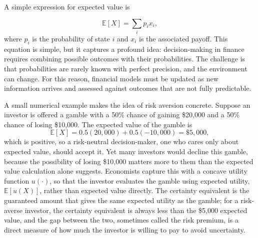 \documentclass[../ai_in_finance]{subfiles}
\begin{document}
A simple expression for expected value is

\begin{equation*}
\mathbb{E}[X] = \sum_i p_i x_i,
\end{equation*}
where $p_i$ is the probability of state $i$ and $x_i$ is the associated payoff. This equation is simple, but it captures a profound idea: decision-making in finance requires combining possible outcomes with their probabilities. The challenge is that probabilities are rarely known with perfect precision, and the environment can change. For this reason, financial models must be updated as new information arrives and assessed against outcomes that are not fully predictable.

A small numerical example makes the idea of risk aversion concrete. Suppose an investor is offered a gamble with a 50\% chance of gaining \$20,000 and a 50\% chance of losing \$10,000. The expected value of the gamble is
\begin{equation*}
\mathbb{E}[X] = 0.5(20{,}000) + 0.5(-10{,}000) = \$5{,}000,
\end{equation*}
which is positive, so a risk-neutral decision-maker, one who cares only about expected value, should accept it. Yet many investors would decline this gamble, because the possibility of losing \$10,000 matters more to them than the expected value calculation alone suggests. Economists capture this with a concave utility function $u(\cdot)$, so that the investor evaluates the gamble using expected utility, $\mathbb{E}[u(X)]$, rather than expected value directly. The certainty equivalent is the guaranteed amount that gives the same expected utility as the gamble; for a risk-averse investor, the certainty equivalent is always less than the \$5,000 expected value, and the gap between the two, sometimes called the risk premium, is a direct measure of how much the investor is willing to pay to avoid uncertainty.
\end{document}
